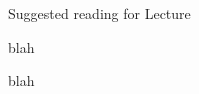 \begin{frame}{Suggested reading for Lecture \thislecture}

\begin{itemize}
{\small
\item blah
\item blah
}
\end{itemize}

\end{frame}


